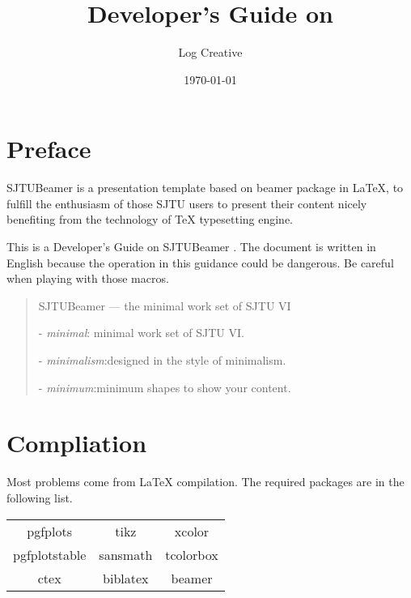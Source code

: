 \documentclass{article}
\title{Developer's Guide on\\ \tmin}
\author{Log Creative}
\date{\today}
\def\tmin{\textsf{SJTUBeamer} \fbox{\textsc{min}}}
\begin{document}
    \maketitle
    \tableofcontents
    \clearpage
    \section{Preface}

    \tmin{} is a presentation template based on \textsf{beamer} package in \LaTeX{}, to fulfill the enthusiasm of those SJTU users to present their content nicely benefiting from the technology of \TeX{} typesetting engine.
    
    This is a Developer's Guide on \tmin{} . The document is written in English because the operation in this guidance could be dangerous. Be careful when playing with those macros.

    \begin{quotation}
        \begin{center}
            \tmin{} --- the minimal work set of SJTU VI
        \end{center}
        \vspace*{1em}

         - \emph{minimal}: \hfill minimal work set of SJTU VI.

         - \emph{minimalism}:\hfill  designed in the style of minimalism.

         - \emph{minimum}:\hfill  minimum shapes to show your content.
    \end{quotation}

    \section{Compliation}

    Most problems come from \LaTeX{} compilation. The required packages are in the following list.
    
    \begin{table}[h]
        \centering
        \begin{tabular}{>{\sffamily}c>{\sffamily}c>{\sffamily}c}
            \hline
            pgfplots & tikz & xcolor \\
            pgfplotstable & sansmath & tcolorbox \\
            ctex & biblatex & beamer \\
            \hline
        \end{tabular}
    \end{table}
\end{document}
